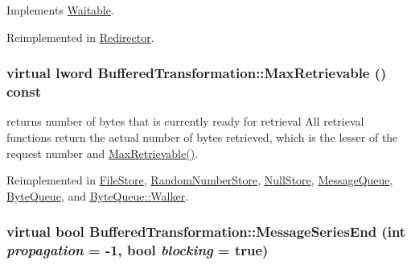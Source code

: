 Implements \hyperlink{class_waitable_a97155f28db33d3dacc69dc453a01609a}{Waitable}.

Reimplemented in \hyperlink{class_redirector_ac0dc5f63f7a57af37f819aa9251a78bf}{Redirector}.\hypertarget{class_buffered_transformation_adf6654e3996270394552d67d2fda95d7}{
\subsubsection[{MaxRetrievable}]{\setlength{\rightskip}{0pt plus 5cm}virtual lword BufferedTransformation::MaxRetrievable () const}}
\label{class_buffered_transformation_adf6654e3996270394552d67d2fda95d7}


returns number of bytes that is currently ready for retrieval All retrieval functions return the actual number of bytes retrieved, which is the lesser of the request number and \hyperlink{class_buffered_transformation_adf6654e3996270394552d67d2fda95d7}{MaxRetrievable()}. 

Reimplemented in \hyperlink{class_file_store_ac003753c1e1a312cdaa6149e5f53bfb9}{FileStore}, \hyperlink{class_random_number_store_afc8f3d56433d1ff117a4e07020f8ad3e}{RandomNumberStore}, \hyperlink{class_null_store_a0d34140b39d88bee6b9610724a7261ee}{NullStore}, \hyperlink{class_message_queue_a636d1842ab46a50cdb8517aec0df6c5d}{MessageQueue}, \hyperlink{class_byte_queue_a56f851da4a1e9518c2b7005807aecab8}{ByteQueue}, and \hyperlink{class_byte_queue_1_1_walker_a3c69dce9261b937f265bae9e8c26479f}{ByteQueue::Walker}.\hypertarget{class_buffered_transformation_a9c9abc61e1cc6c8541a5657e68df1f36}{
\subsubsection[{MessageSeriesEnd}]{\setlength{\rightskip}{0pt plus 5cm}virtual bool BufferedTransformation::MessageSeriesEnd (int {\em propagation} = {\ttfamily -\/1}, \/  bool {\em blocking} = {\ttfamily true})}}
\label{class_buffered_transformation_a9c9abc61e1cc6c8541a5657e68df1f36}


